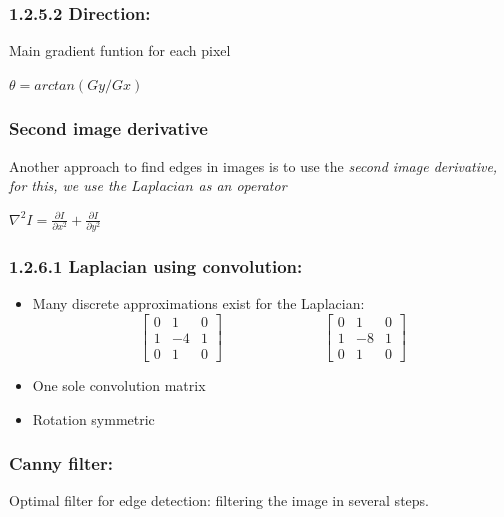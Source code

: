 \subsubsection*{1.2.5.2 Direction:}
Main gradient funtion for each pixel
\begin{center}
$
	\theta = arctan(Gy/Gx)
$
\end{center}
\subsubsection{Second image derivative}
Another approach to find edges in images is to use the \textit{second image derivative, for this, we use the $Laplacian$ as an operator}
\begin{center}
$
	\nabla ^ 2 I = \frac{\partial I}{\partial x ^2} + \frac{\partial I}{\partial y^2}
$
\end{center}
\subsubsection*{1.2.6.1 Laplacian using convolution:}
\begin{itemize}
\item Many discrete approximations exist for the Laplacian:
\[
  \begin{bmatrix}
    0 & 1 & 0\\
    1 & -4 & 1 \\
    0 & 1 & 0
  \end{bmatrix}
  \hspace{3cm}
    \begin{bmatrix}
    0 & 1 & 0\\
    1 & -8 & 1 \\
    0 & 1 & 0
  \end{bmatrix}
\]
\item One sole convolution matrix
\item Rotation symmetric
\end{itemize}
\subsubsection{Canny filter:}
Optimal filter for edge detection: filtering the image in several steps.\\ \par 
